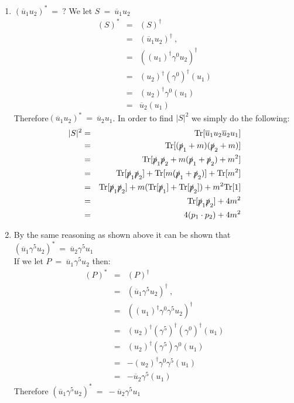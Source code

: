 \documentclass[12pt]{article}
\def \bea{\begin{eqnarray}}
\def \eea{\end{eqnarray}}
\def \Tr{{\rm Tr}}
\def \ou{\overline{u}}
\def \ga{\gamma}
\begin{document}
\begin{enumerate}
\item $ (\ou_1 u_2)^* ~=~ ?$
We let $S ~=~ \ou_1 u_2$
\bea
(S)^* &=& (S)^\dag \\
&=& (\ou_1 u_2)^\dag ~,~~ \\
&=& ((u_1)^\dag\ga^0 u_2)^\dag \\
&=& (u_2)^\dag(\ga^0)^\dag(u_1)\\
&=& (u_2)^\dag\ga^0(u_1)\\
&=& \ou_2(u_1)
\eea
Therefore$(\ou_1 u_2)^* ~=~ \ou_2 u_1$.
In order to find $|S|^2$ we simply do the following:
\bea
|S|^2&=& \Tr[\ou_1 u_2 \ou_2 u_1]  \\
&=& \Tr[(\slashed{p}_1+m)(\slashed{p}_2+m)] \\
&=& \Tr[\slashed{p}_1\slashed{p}_2+m(\slashed{p}_1+\slashed{p}_2)+m^2]\\
&=& \Tr[\slashed{p}_1\slashed{p}_2]+\Tr[m(\slashed{p}_1+\slashed{p}_2)]+\Tr[m^2] \\
&=& \Tr[\slashed{p}_1\slashed{p}_2]+m(\Tr[\slashed{p}_1]+\Tr[\slashed{p}_2])+m^2\Tr[1] \\
&=& \Tr[\slashed{p}_1\slashed{p}_2]+4m^2 \\
&=& 4(p_1 \cdot p_2)+4m^2
\eea

\item  By the same reasoning as shown above it can be shown that $(\ou_1 \ga^5 u_2)^* ~=~ \ou_2 \ga^5 u_1$ \\
If we let $P ~=~ \ou_1\ga^5 u_2$ then:
\bea
(P)^* &=& (P)^\dag  \\\
&=& (\ou_1\ga^5 u_2)^\dag ~,~~ \\
&=& ((u_1)^\dag\ga^0\ga^5 u_2)^\dag \\
&=& (u_2)^\dag(\ga^5)^\dag (\ga^0)^\dag(u_1)\\
&=& (u_2)^\dag(\ga^5) \ga^0(u_1)\\
&=& -(u_2)^\dag \ga^0\ga^5(u_1)\\
&=& -\ou_2\ga^5(u_1)
\eea
Therefore  $(\ou_1 \ga^5 u_2)^* ~=~ -\ou_2 \ga^5 u_1$


\end{enumerate}
\end{document}
